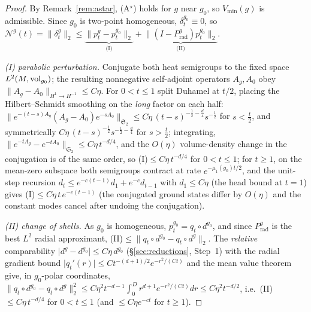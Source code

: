 \begin{proof}
By Remark~\ref{rem:astar}, (A$^\star$) holds for $g$ near $g_0$, so $V_{\min}(g)$ is
admissible. Since $g_0$ is two-point homogeneous, $\delta_t^{g_0}\equiv0$, so
$\mathcal N^g(t)=\lVert\delta_t^g\rVert_2\le
\underbrace{\lVert p_t^g-p_t^{g_0}\rVert_2}_{\text{(I)}}+
\underbrace{\lVert(I-P^g_{\mathrm{rad}})p_t^{g_0}\rVert_2}_{\text{(II)}}$.

\emph{(I) parabolic perturbation.} Conjugate both heat semigroups to the fixed space
$L^2(M,\operatorname{vol}_{g_0})$; the resulting nonnegative self-adjoint operators $A_g,A_0$ obey
$\lVert A_g-A_0\rVert_{H^1\to H^{-1}}\le C\eta$. For $0<t\le1$ split Duhamel at $t/2$, placing
the Hilbert--Schmidt smoothing on the \emph{long} factor on each half:
$\lVert e^{-(t-s)A_g}(A_g-A_0)e^{-sA_0}\rVert_{\mathfrak S_2}\le C\eta\,(t-s)^{-\frac12-\frac d4}s^{-\frac12}$
for $s<\tfrac t2$, and symmetrically $C\eta\,(t-s)^{-\frac12}s^{-\frac12-\frac d4}$ for
$s>\tfrac t2$; integrating, $\lVert e^{-tA_g}-e^{-tA_0}\rVert_{\mathfrak S_2}\le C\eta\,t^{-d/4}$,
and the $O(\eta)$ volume-density change in the conjugation is of the same order, so
(I)$\le C\eta\,t^{-d/4}$ for $0<t\le1$; for $t\ge1$, on the mean-zero subspace both semigroups
contract at rate $e^{-\mu_1(g_0)t/2}$, and the unit-step recursion
$d_t\le e^{-c(t-1)}d_1+e^{-c}d_{t-1}$ with $d_1\le C\eta$ (the head bound at $t=1$) gives
(I)$\le C\eta\,t\,e^{-c(t-1)}$ (the conjugated ground states differ by $O(\eta)$ and the
constant modes cancel after undoing the conjugation).

\emph{(II) change of shells.} As $g_0$ is homogeneous, $p_t^{g_0}=q_t\circ d^{g_0}$, and since
$P^g_{\mathrm{rad}}$ is the best $L^2$ radial approximant,
(II)$\le\lVert q_t\circ d^{g_0}-q_t\circ d^g\rVert_2$. The \emph{relative} comparability
$\lvert d^g-d^{g_0}\rvert\le C\eta\,d^{g_0}$ (\S\ref{sec:reductions}, Step~1) with the radial
gradient bound $\lvert q_t'(r)\rvert\le Ct^{-(d+1)/2}e^{-r^2/(Ct)}$ and the mean value theorem
give, in $g_0$-polar coordinates,
$\lVert q_t\circ d^{g_0}-q_t\circ d^g\rVert_2^2\le C\eta^2 t^{-d-1}\!\int_0^D r^{d+1}e^{-r^2/(Ct)}dr
\le C\eta^2 t^{-d/2}$, i.e.\ (II)$\le C\eta\,t^{-d/4}$ for $0<t\le1$ (and $\le C\eta e^{-ct}$ for
$t\ge1$).


\end{proof}
